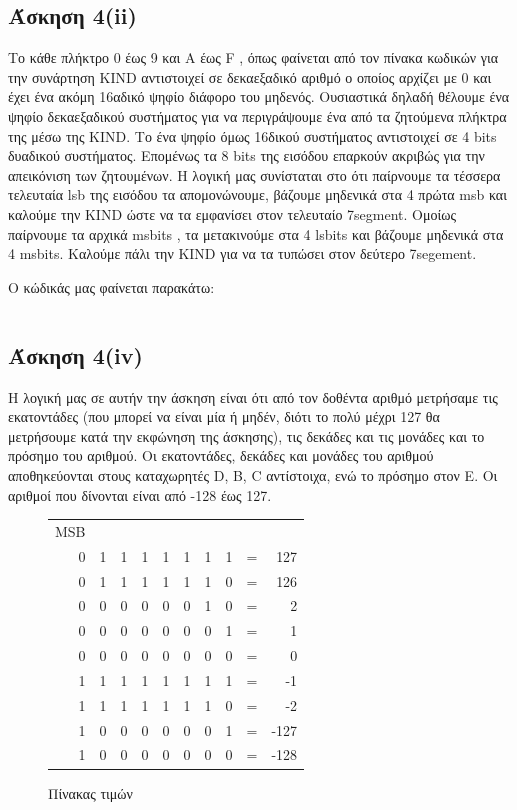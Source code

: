 \documentclass[a4paper,10pt]{article} \usepackage{anysize}
\begin{document}
\subsection*{Άσκηση 4(ii)}
Το κάθε πλήκτρο 0 έως 9 και A έως F , όπως φαίνεται από τον πίνακα κωδικών για την
συνάρτηση KIND αντιστοιχεί σε δεκαεξαδικό αριθμό ο οποίος αρχίζει με 0 και
έχει ένα ακόμη 16αδικό ψηφίο διάφορο του μηδενός. Ουσιαστικά δηλαδή θέλουμε
ένα ψηφίο δεκαεξαδικού συστήματος για να περιγράψουμε ένα από τα ζητούμενα
πλήκτρα της μέσω της KIND. Το ένα ψηφίο όμως 16δικού συστήματος αντιστοιχεί σε
4 bits δυαδικού συστήματος. Επομένως τα 8 bits της εισόδου επαρκούν ακριβώς
για την απεικόνιση των ζητουμένων. Η λογική μας συνίσταται στο ότι παίρνουμε
τα τέσσερα τελευταία lsb της εισόδου τα απομονώνουμε, βάζουμε μηδενικά στα 4
πρώτα msb και καλούμε την KIND ώστε να τα εμφανίσει στον τελευταίο 7segment.
Ομοίως παίρνουμε τα αρχικά msbits , τα μετακινούμε στα 4 lsbits και βάζουμε
μηδενικά στα 4 msbits. Καλούμε πάλι την KIND για να τα τυπώσει στον δεύτερο
7segement.

Ο κώδικάς μας φαίνεται παρακάτω:
\inputminted[linenos,obeytabs,frame=leftline,fontsize=\footnotesize]{oldasm}{files/askhsh_4_ii.8085}
\subsection*{Άσκηση 4(iv)}
Η λογική μας σε αυτήν την άσκηση είναι ότι από τον δοθέντα αριθμό μετρήσαμε
τις εκατοντάδες (που μπορεί να είναι μία ή μηδέν, διότι το πολύ μέχρι 127 θα
μετρήσουμε κατά την εκφώνηση της άσκησης), τις δεκάδες και τις μονάδες και το
πρόσημο του αριθμού. Οι εκατοντάδες, δεκάδες και μονάδες του αριθμού
αποθηκεύονται στους καταχωρητές  D, B, C αντίστοιχα, ενώ το πρόσημο στον E. Οι
αριθμοί που δίνονται είναι από -128 έως 127.\\

\begin{figure}[h]
\centering
\begin{tabular}{r r r r r r r r r r}
MSB &&&&&&&\\
0 & 1 & 1 & 1 & 1 & 1 & 1 & 1 & = & 127\\
0 & 1 & 1 & 1 & 1 & 1 & 1 & 0 & = & 126\\
0 & 0 & 0 & 0 & 0 & 0 & 1 & 0 & = & 2\\
0 & 0 & 0 & 0 & 0 & 0 & 0 & 1 & = & 1\\
0 & 0 & 0 & 0 & 0 & 0 & 0 & 0 & = & 0\\
1 & 1 & 1 & 1 & 1 & 1 & 1 & 1 & = & -1\\
1 & 1 & 1 & 1 & 1 & 1 & 1 & 0 & = & -2\\
1 & 0 & 0 & 0 & 0 & 0 & 0 & 1 & = & -127\\
1 & 0 & 0 & 0 & 0 & 0 & 0 & 0 & = & -128\\
\end{tabular}
\caption{Πίνακας τιμών}
\end{figure}
\end{document}
